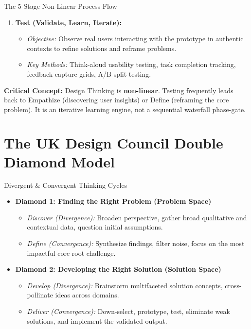 \begin{frameworkbox}{The 5-Stage Non-Linear Process Flow}
\begin{enumerate}[label=\textbf{\arabic*.}, leftmargin=2em]
\begin{itemize}
    \end{itemize}
    \item \textbf{Test (Validate, Learn, Iterate):}
    \begin{itemize}
        \item \textit{Objective:} Observe real users interacting with the prototype in authentic contexts to refine solutions and reframe problems.
        \item \textit{Key Methods:} Think-aloud usability testing, task completion tracking, feedback capture grids, A/B split testing.
    \end{itemize}
\end{enumerate}
\end{frameworkbox}

\begin{memorytip}
\textbf{Critical Concept:} Design Thinking is \textbf{non-linear}. Testing frequently leads back to Empathize (discovering user insights) or Define (reframing the core problem). It is an iterative learning engine, not a sequential waterfall phase-gate.
\end{memorytip}

\section{The UK Design Council Double Diamond Model}

\begin{frameworkbox}{Divergent \& Convergent Thinking Cycles}
\begin{itemize}
    \item \textbf{Diamond 1: Finding the Right Problem (Problem Space)}
    \begin{itemize}
        \item \textit{Discover (Divergence):} Broaden perspective, gather broad qualitative and contextual data, question initial assumptions.
        \item \textit{Define (Convergence):} Synthesize findings, filter noise, focus on the most impactful core root challenge.
    \end{itemize}
    \item \textbf{Diamond 2: Developing the Right Solution (Solution Space)}
    \begin{itemize}
        \item \textit{Develop (Divergence):} Brainstorm multifaceted solution concepts, cross-pollinate ideas across domains.
        \item \textit{Deliver (Convergence):} Down-select, prototype, test, eliminate weak solutions, and implement the validated output.
    \end{itemize}
\end{itemize}
\end{frameworkbox}

